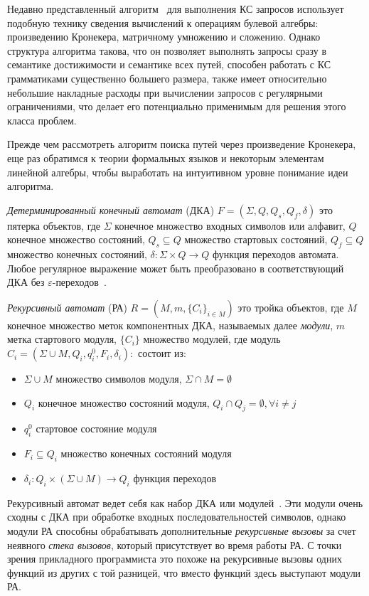 \documentclass[14pt]{matmex-diploma-custom}
\begin{document}
Недавно представленный алгоритм~\cite{inbook:kronecker_cfpq_adbis} для выполнения КС запросов использует подобную технику сведения вычислений к операциям булевой алгебры: произведению Кронекера, матричному умножению и сложению. Однако структура алгоритма такова, что он позволяет выполнять запросы сразу в семантике достижимости и семантике всех путей, способен работать с КС грамматиками существенно большего размера, также имеет относительно небольшие накладные расходы при вычислении запросов с регулярными ограничениями, что делает его потенциально применимым для решения этого класса проблем. 

Прежде чем рассмотреть алгоритм поиска путей через произведение Кронекера, еще раз обратимся к теории формальных языков и некоторым элементам линейной алгебры, чтобы выработать на интуитивном уровне понимание идеи алгоритма.

\textit{Детерминированный конечный автомат} (ДКА) $F = (\Sigma, Q, Q_s, Q_f, \delta)$ это пятерка объектов, где $\Sigma$ конечное множество входных символов или алфавит, $Q$ конечное множество состояний, $Q_s \subseteq Q$ множество стартовых состояний, $Q_f \subseteq Q$ множество конечных состояний, $\delta : \Sigma \times Q \rightarrow Q$ функция переходов автомата. Любое регулярное выражение может быть преобразовано в соответствующий ДКА без $\varepsilon$-переходов~\cite{book:automata_theory}. 

\textit{Рекурсивный автомат} (РА) $R = (M, m, \{C_i\}_{i \in M})$ это тройка объектов, где $M$ конечное множество меток компонентных ДКА, называемых далее \textit{модули}, $m$ метка стартового модуля, $\{C_i\}$ множество модулей, где модуль $C_i = (\Sigma \cup M, Q_i, q_i^0, F_i, \delta _i): $ состоит из:

\begin{itemize}
    \item $\Sigma \cup M$ множество символов модуля, $\Sigma \cap M = \emptyset$
    \item $Q_i$ конечное множество состояний модуля, $Q_i \cap Q_j = \emptyset, \forall i \neq j$
    \item $q_i^0$ стартовое состояние модуля
    \item $F_i \subseteq Q_i$ множество конечных состояний модуля 
    \item $\delta_i : Q_i \times (\Sigma \cup M) \rightarrow Q_i$ функция переходов
\end{itemize}

Рекурсивный автомат ведет себя как набор ДКА или модулей~\cite{article:recursive_state_machines}. Эти модули очень сходны с ДКА при обработке входных последовательностей символов, однако модули РА способны обрабатывать дополнительные \textit{рекурсивные вызовы} за счет неявного \textit{стека вызовов}, который присутствует во время работы РА. С точки зрения прикладного программиста это похоже на рекурсивные вызовы одних функций из других с той разницей, что вместо функций здесь выступают модули РА.
\end{document}
